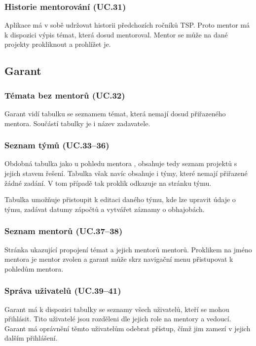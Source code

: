 \documentclass[czech,BP]{thesiskiv}
\begin{document}
			\subsubsection{Historie mentorování (UC.31)}
				\par Aplikace má v sobě udržovat historii předchozích ročníků TSP. Proto mentor má k dispozici výpis témat, která dosud mentoroval. Mentor se může na dané projekty prokliknout a prohlížet je.
		\subsection{Garant}
			\subsubsection{Témata bez mentorů (UC.32)}
			\par Garant vidí tabulku se seznamem témat, která nemají dosud přiřazeného mentora. Součástí tabulky je i název zadavatele.
			\subsubsection{Seznam týmů (UC.33--36)}
			\par Obdobná tabulka jako u pohledu mentora , obsahuje tedy seznam projektů s jejich stavem řešení. Tabulka však navíc obsahuje i týmy, které nemají přiřazené žádné zadání. V tom případě tak proklik odkazuje na stránku týmu.
			\par Tabulka umožňuje přistoupit k editaci daného týmu, kde lze upravit údaje o týmu, zadávat datumy zápočtů a vytvářet záznamy o obhajobách.
			\subsubsection{Seznam mentorů (UC.37--38)}
			\par Stránka ukazující propojení témat a jejich mentorů mentorů. Proklikem na jméno mentora je mentor zvolen a garant může skrz navigační menu přistupovat k pohledům mentora.
			\subsubsection{Správa uživatelů (UC.39--41)}
			\par Garant má k dispozici tabulky se seznamy všech uživatelů, kteří se mohou přihlásit. Tito uživatelé jsou rozděleni dle jejich role na mentory a vedoucí. Garant má oprávnění těmto uživatelům odebrat přístup, čímž jim zamezí v jejich dalším přihlášení.
\end{document}
